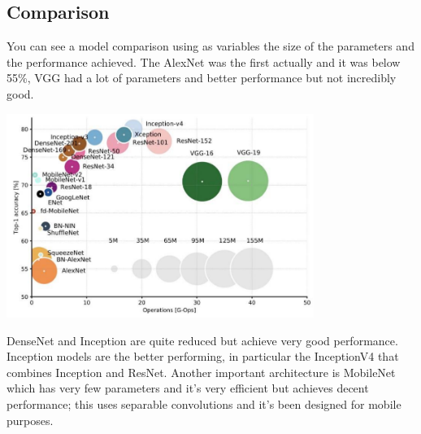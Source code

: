 \subsection{Comparison}
You can see a model comparison using as variables the size of the parameters and the performance achieved. The AlexNet was the first actually and it was below 55\%, VGG had a lot of parameters and better performance but not incredibly good. 
\begin{center}
    \includegraphics[width=0.75\textwidth]{images/model_comparison.PNG}\par
\end{center}
DenseNet and Inception are quite reduced but achieve very good performance. Inception models are the better performing, in particular the InceptionV4 that combines Inception and ResNet. Another important architecture is MobileNet which has very few parameters and it's very efficient but achieves decent performance; this uses separable convolutions and it's been designed for mobile purposes. 